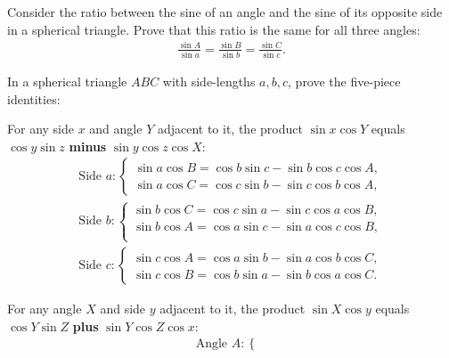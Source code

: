 \begin{tcolorbox}[title={Spherical Law of Sines}]
    Consider the ratio between the sine of an angle and the sine of its opposite side in a spherical triangle. Prove that this ratio is the same for all three angles:
    \begin{align*}
        \frac{\sin A}{\sin a} = \frac{\sin B}{\sin b} = \frac{\sin C}{\sin c}.
    \end{align*}
\end{tcolorbox}

\begin{tcolorbox}[title={Five--Piece Spherical Trigonometric Identities}]
In a spherical triangle $ABC$ with side-lengths $a,b,c$, prove the five-piece identities:
    \begin{question}[name=Side's Sine Times Adjacent Angle's Cosine]
    For any side $x$ and angle $Y$ adjacent to it, the product $\sin x \cos Y$ equals $\cos y \sin z$ \textbf{minus} $\sin y \cos z \cos X$:
        \begin{align*}
        \text{Side } a: \begin{cases}
            \sin a \cos B = \cos b \sin c - \sin b \cos c \cos A,\\
            \sin a \cos C = \cos c \sin b - \sin c \cos b \cos A,            
        \end{cases}\\
        \text{Side } b: \begin{cases}
            \sin b \cos C = \cos c \sin a - \sin c \cos a \cos B,\\
            \sin b \cos A = \cos a \sin c - \sin a \cos c \cos B,\\
        \end{cases}\\
        \text{Side } c: \begin{cases}
            \sin c \cos A = \cos a \sin b - \sin a \cos b \cos C,\\ 
            \sin c \cos B = \cos b \sin a - \sin b \cos a \cos C.
        \end{cases}
        \end{align*}
    \end{question}
    \begin{question}[name=Angle's Sine Times Adjacent Side's Cosine]
    For any angle $X$ and side $y$ adjacent to it, the product $\sin X \cos y$ equals $\cos Y \sin Z$ \textbf{plus} $\sin Y \cos Z \cos x$:
        \begin{align*}
        \text{Angle } A: \begin{cases}

\end{cases}
\end{align*}
\end{question}
\end{tcolorbox}
